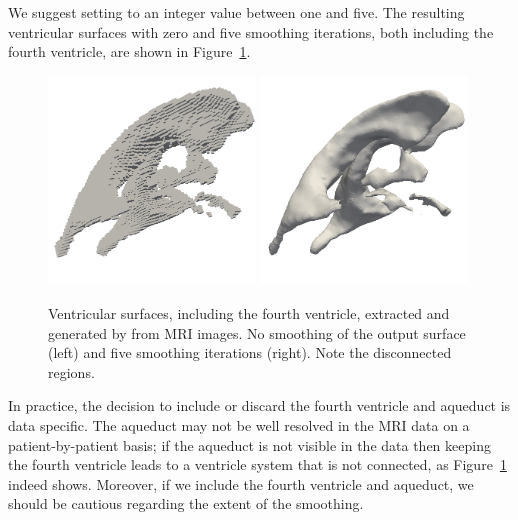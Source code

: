 \noindent We suggest setting  to an
integer value between one and five. The resulting ventricular surfaces
with zero and five smoothing iterations, both including the fourth
ventricle, are shown in
Figure~\ref{fig:chp4:ernie-ventricles-smoothing-example}.
\begin{figure}
  \includegraphics[width=0.49\textwidth]{./graphics/chp4/ernie-vent-0smooth.png}
  \includegraphics[width=0.49\textwidth]{./graphics/chp4/ernie-vent-5smooth.png}
  \caption{Ventricular surfaces, including the fourth ventricle,
    extracted and generated by \freesurfer{} from MRI images. No
    smoothing of the output surface (left) and five smoothing
    iterations (right). Note the disconnected regions.}
  \label{fig:chp4:ernie-ventricles-smoothing-example}
\end{figure}

In practice, the decision to include or discard the fourth ventricle
and aqueduct is data specific. The aqueduct may not be well resolved
in the MRI data on a patient-by-patient basis; if the aqueduct is not
visible in the data then keeping the fourth ventricle leads to a
ventricle system that is not connected, as
Figure~\ref{fig:chp4:ernie-ventricles-smoothing-example} indeed
shows. Moreover, if we include the fourth ventricle and aqueduct,
we should be cautious regarding the extent of the smoothing. 

